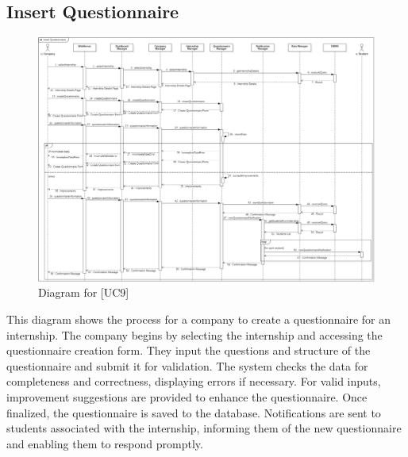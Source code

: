 \subsection{Insert Questionnaire}
\begin{figure} [H]
    \centering
    \includegraphics[width=1\linewidth]{DD/Images/Runtime Sequence Diagram Images/insert_questionnaire.png}
    \caption{Diagram for [UC9]}
    \label{fig: Insert Questionnaire Diagram}
\end{figure}

This diagram shows the process for a company to create a questionnaire for an internship. The company begins by selecting the internship and accessing the questionnaire creation form. They input the questions and structure of the questionnaire and submit it for validation. The system checks the data for completeness and correctness, displaying errors if necessary. For valid inputs, improvement suggestions are provided to enhance the questionnaire. Once finalized, the questionnaire is saved to the database. Notifications are sent to students associated with the internship, informing them of the new questionnaire and enabling them to respond promptly.

